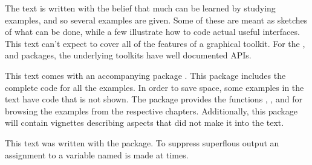 The text is written with the belief that much can be learned by
studying examples, and so several examples are given. Some of these
are meant as sketches of what can be done, while a few illustrate how
to code actual useful interfaces.  This text can't expect to cover all
of the features of a graphical toolkit. For the ,
 and  packages, the underlying toolkits have
well documented APIs.


This text comes with an accompanying package \pkg{\PACKAGENAME}. This
package includes the complete code for all the examples. In order to
save space, some examples in the text have code that is not shown. The
package provides the functions ,
,  and
 for browsing the examples from the respective
chapters. Additionally, this package will contain vignettes describing
aspects that did not make it into the text.


This text was written with the  package. To suppress
superflous output an assignment to a variable named  is made
at times.
 


